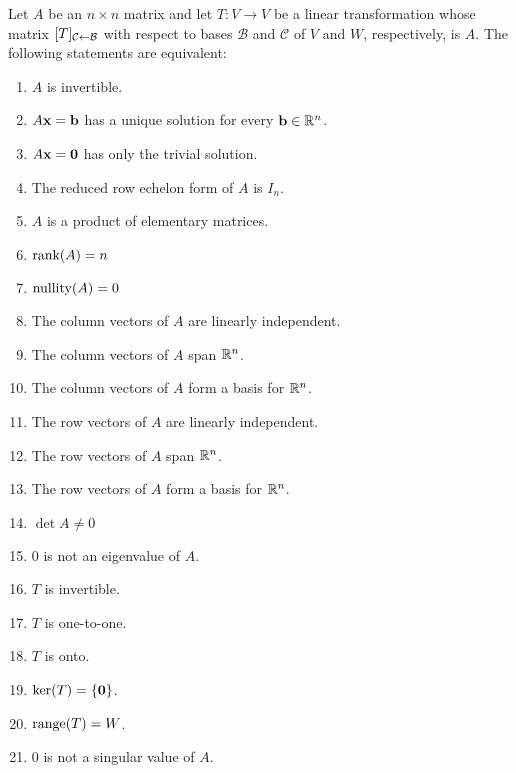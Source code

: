 \documentclass[../m73main.tex]{chapters}
\begin{document}
Let $A$ be an $n\times n$ matrix and let $T : V \to V$ be a linear transformation whose matrix $[T]_{\mathcal{C} \leftarrow \mathcal{B}}$ with respect to bases $\mathcal{B}$ and $\mathcal{C}$ of $V$ and $W$, respectively, is $A$.
The following statements are equivalent: 
\begin{enumerate}[label=(\alph*)]	
	\item $A$ is invertible.
	\item $A\mathbf{x} = \mathbf{b}$ has a unique solution for every $\mathbf{b} \in \mathbb{R}^n$.
	\item $A\mathbf{x} = \mathbf{0}$ has only the trivial solution.
	\item The reduced row echelon form of $A$ is $I_n$.
	\item $A$ is a product of elementary matrices.
	\item $\textrm{rank}(A) = n$
	\item $\textrm{nullity}(A) = 0$
	\item The column vectors of $A$ are linearly independent.
	\item The column vectors of $A$ span $\mathbb{R}^n$.
	\item The column vectors of $A$ form a basis for $\mathbb{R}^n$.
	\item The row vectors of $A$ are linearly independent.
	\item The row vectors of $A$ span $\mathbb{R}^n$.
	\item The row vectors of $A$ form a basis for $\mathbb{R}^n$.
	\item $\det A \neq 0$
	\item 0 is not an eigenvalue of $A$.
	\item $T$ is invertible.
	\item $T$ is one-to-one.
	\item $T$ is onto.
	\item $\textrm{ker}(T) = \{\mathbf{0}\}$.
	\item $\textrm{range}(T) = W$.
	\item 0 is not a singular value of $A$.
\end{enumerate}
\end{document}
